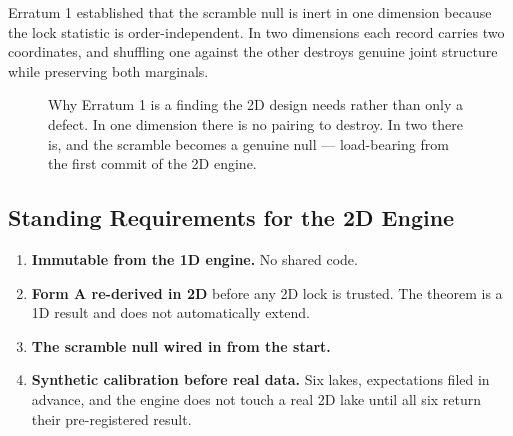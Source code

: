 \documentclass[11pt, letterpaper, openany]{book}
\begin{document}
Erratum 1 established that the scramble null is inert in one dimension because the lock
statistic is order-independent. In two dimensions each record carries two coordinates, and
shuffling one against the other destroys genuine joint structure while preserving both
marginals.

\begin{figure}[H]
\centering
{}
\caption{Why Erratum 1 is a finding the 2D design needs rather than only a defect. In one
dimension there is no pairing to destroy. In two there is, and the scramble becomes a genuine
null --- load-bearing from the first commit of the 2D engine.}
\end{figure}

\subsection{Standing Requirements for the 2D Engine}

\begin{enumerate}
    \item \textbf{Immutable from the 1D engine.} No shared code.
    \item \textbf{Form A re-derived in 2D} before any 2D lock is trusted. The theorem is a 1D
          result and does not automatically extend.
    \item \textbf{The scramble null wired in from the start.}
    \item \textbf{Synthetic calibration before real data.} Six lakes, expectations filed in
          advance, and the engine does not touch a real 2D lake until all six return their
          pre-registered result.
\end{enumerate}
\end{document}

